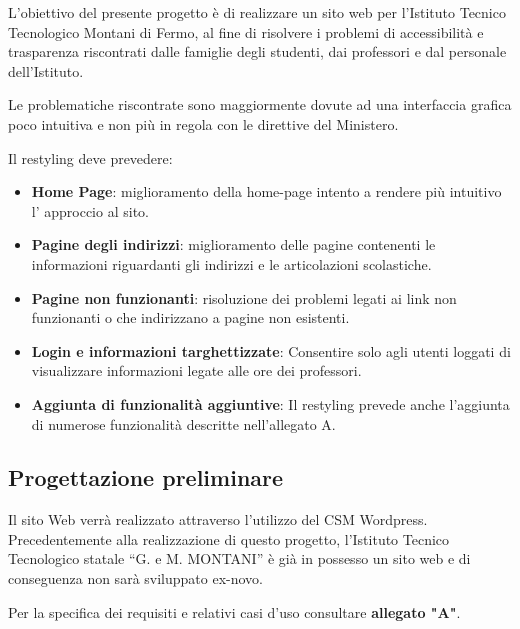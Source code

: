 \documentclass{article}
\begin{document}
	\begin{flushleft}

		L'obiettivo del presente progetto è di realizzare un sito web per l'Istituto Tecnico Tecnologico Montani di Fermo, al fine di risolvere i problemi di accessibilità e trasparenza riscontrati dalle famiglie degli studenti, dai professori e dal personale dell'Istituto. 

		Le problematiche riscontrate sono maggiormente dovute ad una interfaccia grafica poco intuitiva e non più in regola con le direttive del Ministero.   

		Il restyling deve prevedere:

		\begin{itemize}

			\item \textbf{Home Page}: miglioramento della home-page intento a rendere più intuitivo l' approccio al sito. 

			\item \textbf{Pagine degli indirizzi}: miglioramento delle pagine contenenti le informazioni riguardanti gli indirizzi e le articolazioni scolastiche.

			\item \textbf{Pagine non funzionanti}: risoluzione dei problemi legati ai link non funzionanti o che indirizzano a pagine non esistenti.

			\item \textbf{Login e informazioni targhettizzate}: Consentire solo agli utenti loggati di visualizzare informazioni legate alle ore dei professori.

			\item \textbf{Aggiunta di funzionalità aggiuntive}: Il restyling prevede anche l'aggiunta di numerose funzionalità descritte nell'allegato A.

			

		\end{itemize}

		\vspace{2mm}

		

		\subsection{Progettazione preliminare}

		Il sito Web verrà realizzato attraverso l'utilizzo del CSM Wordpress. Precedentemente alla realizzazione di questo progetto, l'Istituto Tecnico Tecnologico statale “G. e M. MONTANI” è già in possesso un sito web e di conseguenza non sarà sviluppato ex-novo.

		Per la specifica dei requisiti e relativi casi d'uso consultare \textbf{allegato "A"}.\\ 

		\vspace{2mm} 

	\end{flushleft}
\end{document}
